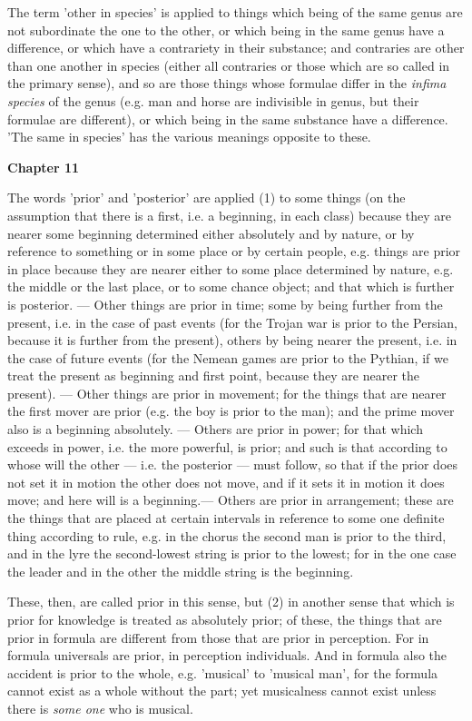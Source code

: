 The term 'other in species' is applied to things which being of the same genus are not subordinate the one to the other, or which being in the same genus have a difference, or which have a contrariety in their substance; and contraries are other than one another in species (either all contraries or those which are so called in the primary sense), and so are those things whose formulae differ in the \emph{infima species} of the genus (e.g. man and horse are indivisible in genus, but their formulae are different), or which being in the same substance have a difference. 'The same in species' has the various meanings opposite to these.

\textbf{Chapter 11}

The words 'prior' and 'posterior' are applied (1) to some things (on the assumption that there is a first, i.e. a beginning, in each class) because they are nearer some beginning determined either absolutely and by nature, or by reference to something or in some place or by certain people, e.g. things are prior in place because they are nearer either to some place determined by nature, e.g. the middle or the last place, or to some chance object; and that which is further is posterior. — Other things are prior in time; some by being further from the present, i.e. in the case of past events (for the Trojan war is prior to the Persian, because it is further from the present), others by being nearer the present, i.e. in the case of future events (for the Nemean games are prior to the Pythian, if we treat the present as beginning and first point, because they are nearer the present). — Other things are prior in movement; for the things that are nearer the first mover are prior (e.g. the boy is prior to the man); and the prime mover also is a beginning absolutely. — Others are prior in power; for that which exceeds in power, i.e. the more powerful, is prior; and such is that according to whose will the other — i.e. the posterior — must follow, so that if the prior does not set it in motion the other does not move, and if it sets it in motion it does move; and here will is a beginning.— Others are prior in arrangement; these are the things that are placed at certain intervals in reference to some one definite thing according to rule, e.g. in the chorus the second man is prior to the third, and in the lyre the second-lowest string is prior to the lowest; for in the one case the leader and in the other the middle string is the beginning.

These, then, are called prior in this sense, but (2) in another sense that which is prior for knowledge is treated as absolutely prior; of these, the things that are prior in formula are different from those that are prior in perception. For in formula universals are prior, in perception individuals. And in formula also the accident is prior to the whole, e.g. 'musical' to 'musical man', for the formula cannot exist as a whole without the part; yet musicalness cannot exist unless there is \emph{some one} who is musical.

